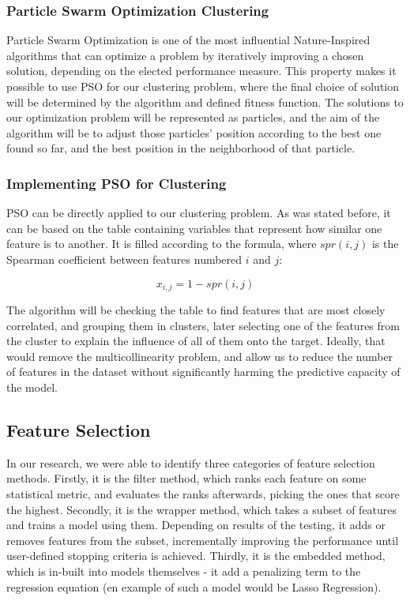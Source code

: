 \documentclass[conference]{IEEEtran}
\begin{document}
\subsubsection{Particle Swarm Optimization Clustering}

Particle Swarm Optimization is one of the most influential Nature-Inspired algorithms that can optimize a problem by iteratively improving a chosen solution, depending on the elected performance measure\cite{ballardini2018tutorial}. This property makes it possible to use PSO for our clustering problem, where the final choice of solution will be determined by the algorithm and defined fitness function. The solutions to our optimization problem will be represented as particles, and the aim of the algorithm will be to adjust those particles' position according to the best one found so far, and the best position in the neighborhood of that particle.

\subsubsection{Implementing PSO for Clustering}

PSO can be directly applied to our clustering problem. As was stated before, it can be based on the table containing variables that represent how similar one feature is to another. It is filled according to the formula, where $spr(i, j)$ is the Spearman coefficient between features numbered $i$ and $j$:

\begin{equation}
	x_{i, j}=1-spr(i, j)
\end{equation}

The algorithm will be checking the table to find features that are most closely correlated, and grouping them in clusters, later selecting one of the features from the cluster to explain the influence of all of them onto the target. Ideally, that would remove the multicollinearity problem, and allow us to reduce the number of features in the dataset without significantly harming the predictive capacity of the model.

\subsection{Feature Selection}

In our research, we were able to identify three categories of feature selection methods. Firstly, it is the filter method, which ranks each feature on some statistical metric, and evaluates the ranks afterwards, picking the ones that score the highest. Secondly, it is the wrapper method, which takes a subset of features and trains a model using them. Depending on results of the testing, it adds or removes features from the subset, incrementally improving the performance until user-defined stopping criteria is achieved. Thirdly, it is the embedded method, which is in-built into models themselves - it add a penalizing term to the regression equation (en example of such a model would be Lasso Regression)\cite{twdMLfeatsec}.\\
\end{document}
